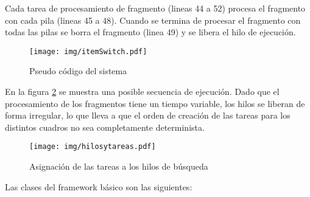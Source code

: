 Cada tarea de procesamiento de fragmento (lineas 44 a 52) procesa el fragmento
con cada pila (lineas 45 a 48). Cuando se termina de procesar el fragmento con
todas las pilas se borra el fragmento (linea 49) y se libera el hilo de
ejecución.

\begin{figure}[!h]

	\centering

	\texttt{[image: img/itemSwitch.pdf]}

	\caption{Pseudo código del sistema}

	\label{codigo}

\end{figure}

En la figura \ref{hilosytareas} se muestra una posible secuencia de ejecución.
Dado que el procesamiento de los fragmentos tiene un tiempo variable, los hilos
se liberan de forma irregular, lo que lleva a que el orden de creación de las
tareas para los distintos cuadros no sea completamente determinista.

\begin{figure}[!h]

	\texttt{[image: img/hilosytareas.pdf]}

	\caption{Asignación de las tareas a los hilos de búsqueda}

	\label{hilosytareas}

\end{figure}

Las clases del framework básico son las siguientes:

